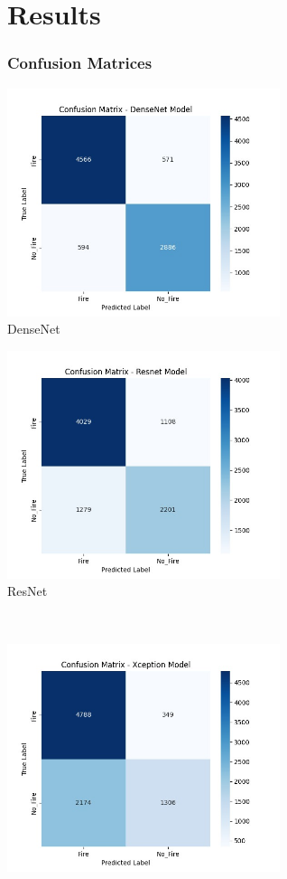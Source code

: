\section{Results}
\label{sec:results}

\begin{frame}
    \frametitle{Confusion Matrices}

    \begin{minipage}[c]{0.5\textwidth}
        \centering
        \includegraphics[width=0.6\textwidth]{images/densenet}\\
        DenseNet
    \end{minipage}%
    \begin{minipage}[c]{0.5\textwidth}
        \centering
        \includegraphics[width=0.6\textwidth]{images/resnet}\\
        ResNet
    \end{minipage}\\
    \begin{minipage}[c]{0.5\textwidth}
        \centering
        \includegraphics[width=0.6\textwidth]{images/xception}\\

\end{minipage}
\end{frame}
